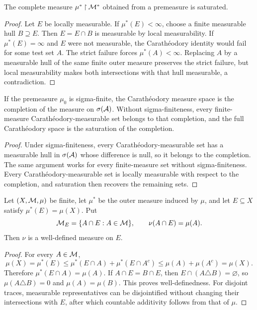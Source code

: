 \begin{prop}
The complete measure $\mu^*\mathbin{\upharpoonright}\mathcal{M}^*$ obtained from a premeasure is saturated.
\end{prop}

\begin{proof}
Let $E$ be locally measurable. If $\mu^*(E)<\infty$, choose a finite measurable hull $B\supseteq E$. Then $E=E\cap B$ is measurable by local measurability. If $\mu^*(E)=\infty$ and $E$ were not measurable, the Carath\'eodory identity would fail for some test set $A$. The strict failure forces $\mu^*(A)<\infty$. Replacing $A$ by a measurable hull of the same finite outer measure preserves the strict failure, but local measurability makes both intersections with that hull measurable, a contradiction.
\end{proof}

\begin{prop}
If the premeasure $\mu_0$ is sigma-finite, the Carath\'eodory measure space is the completion of the measure on $\sigma(\mathcal{A})$. Without sigma-finiteness, every finite-measure Carath\'eodory-measurable set belongs to that completion, and the full Carath\'eodory space is the saturation of the completion.
\end{prop}

\begin{proof}
Under sigma-finiteness, every Carath\'eodory-measurable set has a measurable hull in $\sigma(\mathcal{A})$ whose difference is null, so it belongs to the completion. The same argument works for every finite-measure set without sigma-finiteness. Every Carath\'eodory-measurable set is locally measurable with respect to the completion, and saturation then recovers the remaining sets.
\end{proof}

\begin{prop}
Let $(X,\mathcal{M},\mu)$ be finite, let $\mu^*$ be the outer measure induced by $\mu$, and let $E\subseteq X$ satisfy $\mu^*(E)=\mu(X)$. Put
\[
\mathcal{M}_E=\{A\cap E:A\in\mathcal{M}\},
\qquad
\nu(A\cap E)=\mu(A).
\]
Then $\nu$ is a well-defined measure on $E$.
\end{prop}

\begin{proof}
For every $A\in\mathcal{M}$,
\[
\mu(X)=\mu^*(E)
 \leq\mu^*(E\cap A)+\mu^*(E\cap A^c)
 \leq\mu(A)+\mu(A^c)=\mu(X).
\]
Therefore $\mu^*(E\cap A)=\mu(A)$. If $A\cap E=B\cap E$, then $E\cap(A\triangle B)=\varnothing$, so $\mu(A\triangle B)=0$ and $\mu(A)=\mu(B)$. This proves well-definedness. For disjoint traces, measurable representatives can be disjointified without changing their intersections with $E$, after which countable additivity follows from that of $\mu$.
\end{proof}

